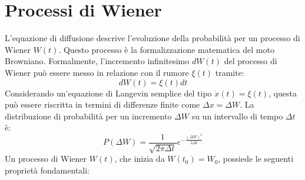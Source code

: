 \section{Processi di Wiener}
L'equazione di diffusione descrive l'evoluzione della probabilità per un processo di Wiener $W(t)$. Questo processo è la formalizzazione matematica del moto Browniano.
Formalmente, l'incremento infinitesimo $dW(t)$ del processo di Wiener può essere messo in relazione con il rumore $\xi(t)$ tramite:
\begin{equation}
dW(t) = \xi(t)dt
\end{equation}
Considerando un'equazione di Langevin semplice del tipo $\dot{x}(t) = \xi(t)$, questa può essere riscritta in termini di differenze finite come $\Delta x = \Delta W$.
La distribuzione di probabilità per un incremento $\Delta W$ su un intervallo di tempo $\Delta t$ è:
\begin{equation}
P(\Delta W) = \frac{1}{\sqrt{2\pi \Delta t}} e^{-\frac{(\Delta W)^2}{2\Delta t}}
\end{equation}
Un processo di Wiener $W(t)$, che inizia da $W(t_0)=W_0$, possiede le seguenti proprietà fondamentali:

